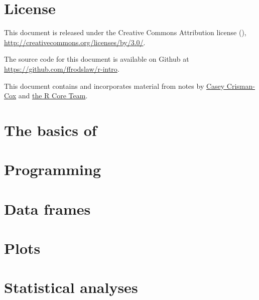 


\begin{titlepage}

\maketitle

\vspace*{4cm}
\thispagestyle{empty}

\end{titlepage}


\newpage

\section*{License}
\thispagestyle{empty}

\noindent%
This document is released under the Creative Commons Attribution license
(\ccby), {\small \url{http://creativecommons.org/licenses/by/3.0/}}.

\bigskip%
\noindent%
The source code for this document is available on Github at
{\small \url{https://github.com/ffrodslaw/r-intro}}.

\bigskip%
\noindent%
This document contains and incorporates material from notes by \href{https://drive.google.com/file/d/0BzD2LimxGIzIeWppdWxCZHR1T2M/view?usp=sharing}{Casey Crisman-Cox} and  \href{https://cran.r-project.org/doc/manuals/r-release/R-intro.pdf}{the R Core Team}.

\pagebreak

{\small \tableofcontents}
\thispagestyle{empty}

\pagebreak
\setcounter{page}{1}

\section{The basics of \R}


\newpage
\section{Programming}


\newpage
\section{Data frames}


\newpage
\section{Plots}
	

\newpage
\section{Statistical analyses}


\newpage
% 

%


